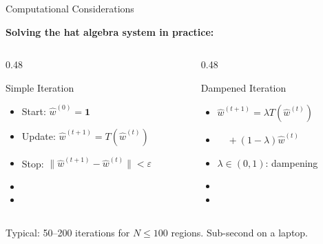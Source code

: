 \documentclass{beamer}
\begin{document}
\begin{frame}{Computational Considerations}

    \textbf{Solving the hat algebra system in practice:}

    \vspace{0.3em}
    \begin{columns}[T]
        \begin{column}{0.48\textwidth}
            \begin{block}{Simple Iteration}
                \begin{itemize}
                    \item Start: $\hat{w}^{(0)} = \bm{1}$
                    \item Update: $\hat{w}^{(t+1)} = T(\hat{w}^{(t)})$
                    \item Stop: $\|\hat{w}^{(t+1)} - \hat{w}^{(t)}\| < \varepsilon$
                    \item {}
                    \item {}
                \end{itemize}
            \end{block}
        \end{column}
        \begin{column}{0.48\textwidth}
            \begin{block}{Dampened Iteration}
                \begin{itemize}
                    \item $\hat{w}^{(t+1)} = \lambda T(\hat{w}^{(t)})$
                    \item[] $\quad + (1-\lambda) \hat{w}^{(t)}$
                    \item $\lambda \in (0,1)$: dampening
                    \item {}
                    \item {}
                \end{itemize}
            \end{block}
        \end{column}
    \end{columns}

    \vspace{0.3em}
    Typical: 50--200 iterations for $N \leq 100$ regions. Sub-second on a laptop. \quad {}

\end{frame}
\end{document}
